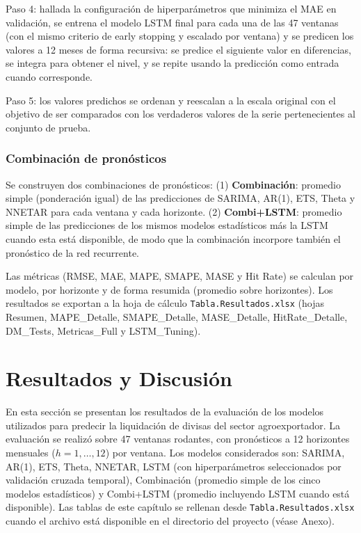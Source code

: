 \documentclass[
  12pt, a4paper, oneside]{article}
\begin{document}
Paso 4: hallada la configuración de hiperparámetros que minimiza el MAE en validación, se entrena el modelo LSTM final para cada una de las 47 ventanas (con el mismo criterio de early stopping y escalado por ventana) y se predicen los valores a 12 meses de forma recursiva: se predice el siguiente valor en diferencias, se integra para obtener el nivel, y se repite usando la predicción como entrada cuando corresponde.

Paso 5: los valores predichos se ordenan y reescalan a la escala original con el objetivo de ser comparados con los verdaderos valores de la serie pertenecientes al conjunto de prueba.

\subsubsection{Combinación de pronósticos}\label{combinaciuxf3n-de-pronuxf3sticos}

Se construyen dos combinaciones de pronósticos: (1) \textbf{Combinación}: promedio simple (ponderación igual) de las predicciones de SARIMA, AR(1), ETS, Theta y NNETAR para cada ventana y cada horizonte. (2) \textbf{Combi+LSTM}: promedio simple de las predicciones de los mismos modelos estadísticos más la LSTM cuando esta está disponible, de modo que la combinación incorpore también el pronóstico de la red recurrente.

Las métricas (RMSE, MAE, MAPE, SMAPE, MASE y Hit Rate) se calculan por modelo, por horizonte y de forma resumida (promedio sobre horizontes). Los resultados se exportan a la hoja de cálculo \texttt{Tabla.Resultados.xlsx} (hojas Resumen, MAPE\_Detalle, SMAPE\_Detalle, MASE\_Detalle, HitRate\_Detalle, DM\_Tests, Metricas\_Full y LSTM\_Tuning).

\section{Resultados y Discusión}\label{resultados-y-discusiuxf3n}

En esta sección se presentan los resultados de la evaluación de los modelos utilizados para predecir la liquidación de divisas del sector agroexportador. La evaluación se realizó sobre 47 ventanas rodantes, con pronósticos a 12 horizontes mensuales (\(h=1,\ldots,12\)) por ventana. Los modelos considerados son: SARIMA, AR(1), ETS, Theta, NNETAR, LSTM (con hiperparámetros seleccionados por validación cruzada temporal), Combinación (promedio simple de los cinco modelos estadísticos) y Combi+LSTM (promedio incluyendo LSTM cuando está disponible). Las tablas de este capítulo se rellenan desde \texttt{Tabla.Resultados.xlsx} cuando el archivo está disponible en el directorio del proyecto (véase Anexo).
\end{document}
